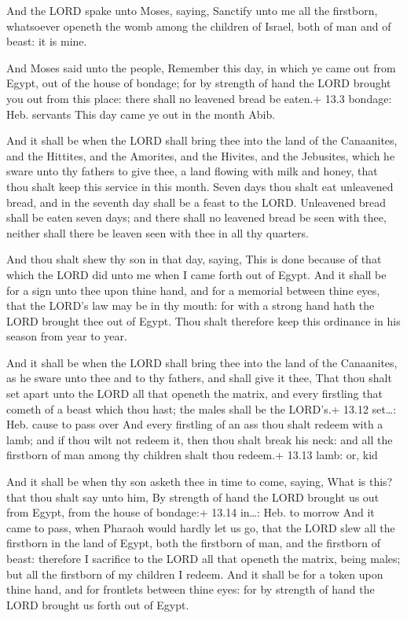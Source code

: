  And the LORD spake unto Moses, saying, 
Sanctify unto me all the firstborn, whatsoever openeth the womb among
the children of Israel, both of man and of beast: it is mine.

 And Moses said unto the people, Remember this day, in
which ye came out from Egypt, out of the house of bondage; for by
strength of hand the LORD brought you out from this place: there shall
no leavened bread be eaten.+ 13.3 bondage: Heb. servants 
This day came ye out in the month Abib.

 And it shall be when the LORD shall bring thee into the
land of the Canaanites, and the Hittites, and the Amorites, and the
Hivites, and the Jebusites, which he sware unto thy fathers to give
thee, a land flowing with milk and honey, that thou shalt keep this
service in this month.  Seven days thou shalt eat unleavened
bread, and in the seventh day shall be a feast to the LORD. 
Unleavened bread shall be eaten seven days; and there shall no leavened
bread be seen with thee, neither shall there be leaven seen with thee in
all thy quarters.

 And thou shalt shew thy son in that day, saying, This is
done because of that which the LORD did unto me when I came forth out of
Egypt.  And it shall be for a sign unto thee upon thine
hand, and for a memorial between thine eyes, that the LORD's law may be
in thy mouth: for with a strong hand hath the LORD brought thee out of
Egypt.  Thou shalt therefore keep this ordinance in his
season from year to year.

 And it shall be when the LORD shall bring thee into the
land of the Canaanites, as he sware unto thee and to thy fathers, and
shall give it thee,  That thou shalt set apart unto the
LORD all that openeth the matrix, and every firstling that cometh of a
beast which thou hast; the males shall be the LORD's.+ 13.12 set\ldots:
Heb. cause to pass over  And every firstling of an ass thou
shalt redeem with a lamb; and if thou wilt not redeem it, then thou
shalt break his neck: and all the firstborn of man among thy children
shalt thou redeem.+ 13.13 lamb: or, kid

 And it shall be when thy son asketh thee in time to
come, saying, What is this? that thou shalt say unto him, By strength of
hand the LORD brought us out from Egypt, from the house of bondage:+
13.14 in\ldots: Heb. to morrow  And it came to pass, when
Pharaoh would hardly let us go, that the LORD slew all the firstborn in
the land of Egypt, both the firstborn of man, and the firstborn of
beast: therefore I sacrifice to the LORD all that openeth the matrix,
being males; but all the firstborn of my children I redeem.
 And it shall be for a token upon thine hand, and for
frontlets between thine eyes: for by strength of hand the LORD brought
us forth out of Egypt.

